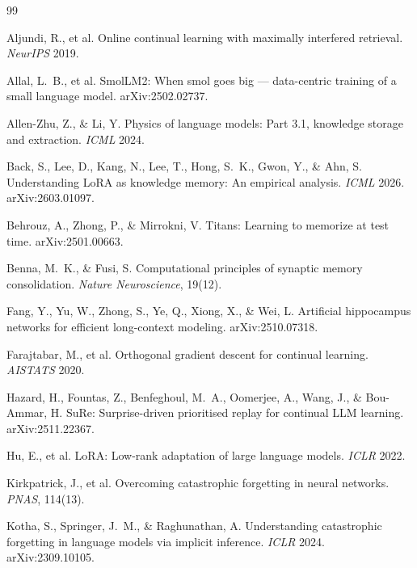 \documentclass[11pt]{article}
\begin{document}
\begin{thebibliography}{99}\small

 Aljundi, R., et al. Online continual learning with
maximally interfered retrieval. \emph{NeurIPS} 2019.

 Allal, L.~B., et al. SmolLM2: When smol goes big ---
data-centric training of a small language model. arXiv:2502.02737.

 Allen-Zhu, Z., \& Li, Y. Physics of language models:
Part 3.1, knowledge storage and extraction. \emph{ICML} 2024.

 Back, S., Lee, D., Kang, N., Lee, T., Hong, S.~K., Gwon, Y.,
\& Ahn, S. Understanding LoRA as knowledge memory: An empirical analysis. \emph{ICML} 2026.
arXiv:2603.01097.

 Behrouz, A., Zhong, P., \& Mirrokni, V. Titans:
Learning to memorize at test time. arXiv:2501.00663.

 Benna, M.~K., \& Fusi, S. Computational principles of
synaptic memory consolidation. \emph{Nature Neuroscience}, 19(12).

 Fang, Y., Yu, W., Zhong, S., Ye, Q., Xiong, X., \& Wei, L.
Artificial hippocampus networks for efficient long-context modeling. arXiv:2510.07318.

 Farajtabar, M., et al. Orthogonal gradient
descent for continual learning. \emph{AISTATS} 2020.

 Hazard, H., Fountas, Z., Benfeghoul, M.~A., Oomerjee, A.,
Wang, J., \& Bou-Ammar, H. SuRe: Surprise-driven prioritised replay for continual LLM learning.
arXiv:2511.22367.

 Hu, E., et al. LoRA: Low-rank adaptation of large language
models. \emph{ICLR} 2022.

 Kirkpatrick, J., et al. Overcoming catastrophic
forgetting in neural networks. \emph{PNAS}, 114(13).

 Kotha, S., Springer, J.~M., \& Raghunathan, A. Understanding
catastrophic forgetting in language models via implicit inference. \emph{ICLR} 2024. arXiv:2309.10105.


\end{thebibliography}
\end{document}
